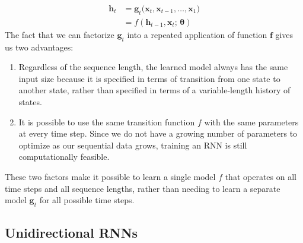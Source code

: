 \documentclass{article}
\begin{document}
  \begin{align*}
      \mathbf{h}_t & = \mathbf{g}_t \big( \mathbf{x}_t, \mathbf{x}_{t - 1}, \ldots, \mathbf{x}_1 \big) \\
      & = f(\mathbf{h}_{t - 1}, \mathbf{x}_t; \, \boldsymbol{\theta}) 
  \end{align*}
  The fact that we can factorize $\mathbf{g}_t$ into a repeated application of function $\mathbf{f}$ gives us two advantages: 
  \begin{enumerate}
      \item Regardless of the sequence length, the learned model always has the same input size because it is specified in terms of transition from one state to another state, rather than specified in terms of a variable-length history of states. 

      \item It is possible to use the same transition function $f$ with the same parameters at every time step. Since we do not have a growing number of parameters to optimize as our sequential data grows, training an RNN is still computationally feasible. 
  \end{enumerate}
  These two factors make it possible to learn a single model $f$ that operates on all time steps and all sequence lengths, rather than needing to learn a separate model $\mathbf{g}_t$ for all possible time steps. 

  \subsection{Unidirectional RNNs}
\end{document}
